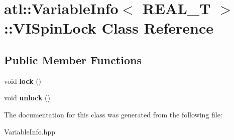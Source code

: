 \hypertarget{classatl_1_1_variable_info_1_1_v_i_spin_lock}{\section{atl\+:\+:Variable\+Info$<$ R\+E\+A\+L\+\_\+\+T $>$\+:\+:V\+I\+Spin\+Lock Class Reference}
\label{classatl_1_1_variable_info_1_1_v_i_spin_lock}
}
\subsection*{Public Member Functions}
\begin{DoxyCompactItemize}
\item 
\hypertarget{classatl_1_1_variable_info_1_1_v_i_spin_lock_a957f7fa52c1c3647c74697b8718abfc0}{void {\bfseries lock} ()}\label{classatl_1_1_variable_info_1_1_v_i_spin_lock_a957f7fa52c1c3647c74697b8718abfc0}

\item 
\hypertarget{classatl_1_1_variable_info_1_1_v_i_spin_lock_aa7bb227ca73abf2218b16938a6fc29fa}{void {\bfseries unlock} ()}\label{classatl_1_1_variable_info_1_1_v_i_spin_lock_aa7bb227ca73abf2218b16938a6fc29fa}

\end{DoxyCompactItemize}


The documentation for this class was generated from the following file\+:\begin{DoxyCompactItemize}
\item 
Variable\+Info.\+hpp\end{DoxyCompactItemize}
